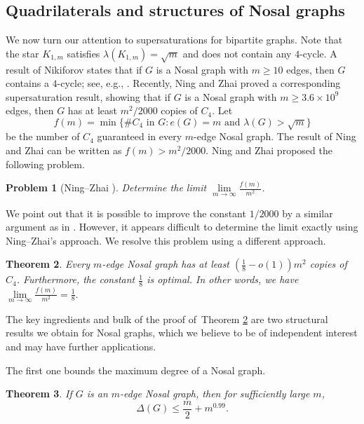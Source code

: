 \documentclass[11pt,a4paper]{article}
\newtheorem{theorem}{Theorem}[section]
\newtheorem{problem}[theorem]{Problem}
\theoremstyle{definition}
\theoremstyle{remark}
\begin{document}
\subsection{Quadrilaterals and structures of Nosal graphs} 
We now turn our attention to supersaturations for bipartite graphs. Note that the star $K_{1,m}$ satisfies $\lambda(K_{1,m})=\sqrt{m}$ and does not contain any $4$-cycle.
A result of Nikiforov \cite{Niki2009} states that if $G$ is a Nosal graph with $m\ge 10$ edges, then $G$ contains a $4$-cycle; see, e.g., \cite{ZLS2021,ZS2022dm}. 
 Recently, Ning and Zhai \cite{NZ2021b} proved a corresponding supersaturation result, showing that if $G$ is a Nosal graph with $m\ge 3.6\times 10^9$ edges, then 
$G$ has at least $m^2/2000$ copies of $C_4$. Let 
\[ f(m)= \min\{\text{$\#C_4$ in $G$}: e(G)=m \text{~and~} 
\lambda (G) > \sqrt{m}\}\] 
be the number of $C_4$ guaranteed in every $m$-edge Nosal graph. The result of Ning and Zhai \cite{NZ2021b}  can be written as 
$f(m) > m^2/2000.$
Ning and Zhai proposed the following problem. 
 

\begin{problem}[Ning--Zhai \cite{NZ2021b}]
    Determine the limit $\lim\limits_{m\to \infty} \frac{f(m)}{m^2}$. 
\end{problem}

We point out that  
it is possible to improve the constant $1/2000$ by a similar argument as in \cite{NZ2021b}. 
However, it appears difficult to determine the limit exactly using Ning--Zhai's approach. 
We resolve 
this problem using a different approach. 

\begin{theorem} \label{thm:lim}
Every $m$-edge Nosal graph has at least $( \frac{1}{8} - o(1)) m^2$ copies of $C_4$. Furthermore, the constant $\frac{1}{8}$ is optimal. In other words, we have $\lim\limits_{m\to \infty} \frac{f(m)}{m^2} 
= \frac{1}{8}.$ 
\end{theorem}

The key ingredients and bulk of the proof of~Theorem \ref{thm:lim} are two structural results we obtain for Nosal graphs, which we believe to be of independent interest and may have further applications.

The first one bounds the maximum degree of a Nosal graph.
\begin{theorem}
        \label{lem:Nosal-max-degree}
    If $G$ is an $m$-edge Nosal graph, 
    then for sufficiently large $m$,  
    \[ \Delta(G) \leq \frac{m}{2} + m^{0.99}.\] 
\end{theorem}
\end{document}
